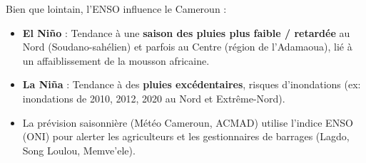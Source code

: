 \documentclass[11pt]{article}
\begin{document}
\begin{savaistu}
Bien que lointain, l'ENSO influence le Cameroun :
\begin{itemize}
    \item \textbf{El Niño} : Tendance à une \textbf{saison des pluies plus faible / retardée} au Nord (Soudano-sahélien) et parfois au Centre (région de l'Adamaoua), lié à un affaiblissement de la mousson africaine.
    \item \textbf{La Niña} : Tendance à des \textbf{pluies excédentaires}, risques d'inondations (ex: inondations de 2010, 2012, 2020 au Nord et Extrême-Nord).
    \item La prévision saisonnière (Météo Cameroun, ACMAD) utilise l'indice ENSO (ONI) pour alerter les agriculteurs et les gestionnaires de barrages (Lagdo, Song Loulou, Memve'ele).
\end{itemize}
\end{savaistu}
\end{document}
